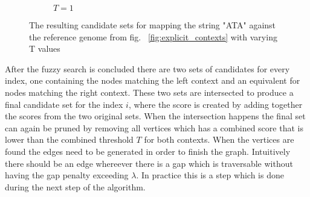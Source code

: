 \documentclass{article}
\begin{document}
\begin{wrapfigure}{L}{0.5\textwidth}
\begin{subfigure}[t]{\textwidth}
\begin{mdframed}
    \end{mdframed}
    \caption{$T=1$}
  \end{subfigure}
  \caption{The resulting candidate sets for mapping the string "ATA" against the reference genome from fig. ~\ref{fig:explicit_contexts} with varying T values}
  \label{fig:candidate_nodes}
\end{wrapfigure}
After the fuzzy search is concluded there are two sets of candidates for every index, one containing the nodes matching the left context and an equivalent for nodes matching the right context. These two sets are intersected to produce a final candidate set for the index $i$, where the score is created by adding together the scores from the two original sets. When the intersection happens the final set can again be pruned by removing all vertices which has a combined score that is lower than the combined threshold $T$ for both contexts. When the vertices are found the edges need to be generated in order to finish the graph. Intuitively there should be an edge whereever there is a gap which is traversable without having the gap penalty exceeding $\lambda$. In practice this is a step which is done during the next step of the algorithm.\\
\end{document}
